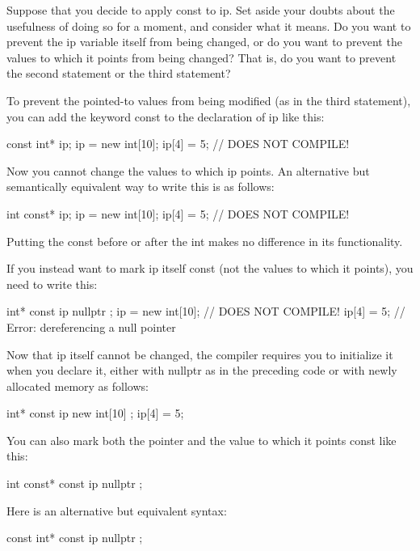 Suppose that you decide to apply const to ip. Set aside your doubts about the usefulness of doing so for a moment, and consider what it means. Do you want to prevent the ip variable itself from being changed, or do you want to prevent the values to which it points from being changed? That is, do you want to prevent the second statement or the third statement?

To prevent the pointed-to values from being modified (as in the third statement), you can add the keyword const to the declaration of ip like this:

\begin{cpp}
const int* ip;
ip = new int[10];
ip[4] = 5; // DOES NOT COMPILE!
\end{cpp}

Now you cannot change the values to which ip points. An alternative but semantically equivalent way to write this is as follows:

\begin{cpp}
int const* ip;
ip = new int[10];
ip[4] = 5; // DOES NOT COMPILE!
\end{cpp}

Putting the const before or after the int makes no difference in its functionality.

If you instead want to mark ip itself const (not the values to which it points), you need to write this:

\begin{cpp}
int* const ip { nullptr };
ip = new int[10]; // DOES NOT COMPILE!
ip[4] = 5; // Error: dereferencing a null pointer
\end{cpp}

Now that ip itself cannot be changed, the compiler requires you to initialize it when you declare it, either with nullptr as in the preceding code or with newly allocated memory as follows:

\begin{cpp}
int* const ip { new int[10] };
ip[4] = 5;
\end{cpp}

You can also mark both the pointer and the value to which it points const like this:

\begin{cpp}
int const* const ip { nullptr };
\end{cpp}

Here is an alternative but equivalent syntax:

\begin{cpp}
const int* const ip { nullptr };
\end{cpp}

